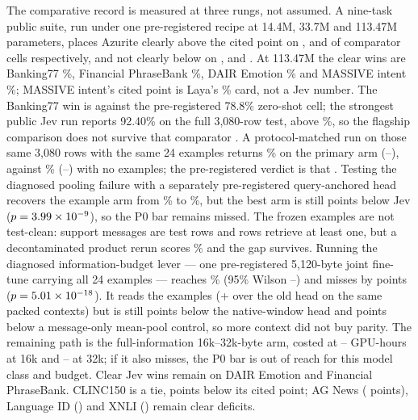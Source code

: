 The comparative record is measured at three rungs, not assumed. A nine-task
public suite, run under one pre-registered recipe at 14.4M, 33.7M and 113.47M
parameters, places Azurite clearly above the cited point on \SuiteSmallClear,
\SuiteMidClear{} and \SuiteLargeClear{} of \SuiteComparatorCells{} comparator
cells respectively, and not clearly below on \SuiteSmallAtOrAboveThree,
\SuiteMidAtOrAboveThree{} and \SuiteLargeAtOrAbove. At 113.47M the clear wins are
Banking77 \SuiteLargeBank\%, Financial PhraseBank \SuiteLargeFinancial\%, DAIR
Emotion \SuiteLargeEmotion\% and MASSIVE intent \SuiteLargeMassiveIntent\%;
MASSIVE intent's cited point is Laya's \SuiteCitedMassiveIntent\% card, not a Jev
number. The Banking77 win is against the pre-registered 78.8\% zero-shot cell;
the strongest public Jev run reports 92.40\% on the full 3,080-row test, above
\SuiteLargeBank\%, so the flagship comparison does not survive that comparator
\citep{smith2026jevbanking}. A protocol-matched run on those same 3,080 rows
with the same 24 examples returns \JevMatchPctAOne\% on the primary arm
(\JevMatchAOneLo--\JevMatchAOneHi), against \JevMatchPctNoEx\%
(\JevMatchNoExLo--\JevMatchNoExHi) with no examples; the pre-registered verdict
is that \JevMatchVerdict. Testing the diagnosed pooling failure with a
separately pre-registered query-anchored head recovers the example arm from
\QueryPctOldTwo\% to \QueryPctQueryTwo\%, but the best arm is still
\QueryDiffAbs{} points below Jev ($p = 3.99\times10^{-9}$), so the P0 bar remains
missed. The frozen examples are not test-clean: \ContamSupportMatches{} support
messages are test rows and \ContamEvalRows{} rows retrieve at least one, but a
decontaminated product rerun scores \ContamCleanAcc\% and the gap survives.
Running the diagnosed information-budget lever --- one pre-registered
5{,}120-byte joint fine-tune carrying all 24 examples --- reaches
\LenPctLenTwo\% (95\% Wilson \LenLoLenTwo--\LenHiLenTwo) and misses by
\LenDiffAbs{} points ($p = 5.01\times10^{-18}$). It reads the examples (+\LenMechGainAbs{}
over the old head on the same packed contexts) but is still \LenNativeGapAbs{}
points below the native-window head and \LenVsOldZeroAbs{} points below a
message-only mean-pool control, so more context did not buy parity. The
remaining path is the full-information 16k--32k-byte arm, costed at
\LenNextShortLo--\LenNextShortHi{} GPU-hours at 16k and
\LenNextLongLo--\LenNextLongHi{} at 32k; if it also misses, the P0 bar is out of
reach for this model class
and budget. Clear Jev wins remain on DAIR Emotion and Financial PhraseBank. CLINC150 is a tie, \SuiteLargeShortClinc{} points
below its cited point; AG News (\SuiteLargeShortAg{} points), Language ID
(\SuiteLargeShortLang) and XNLI (\SuiteLargeShortXnli{}) remain clear deficits.

